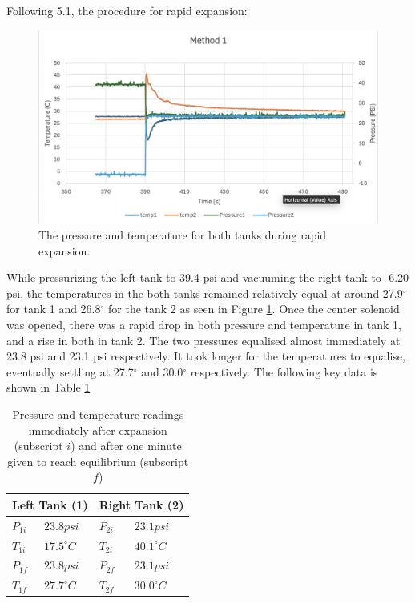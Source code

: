 \documentclass[titlepage, twocolumn, 12pt]{article}
\begin{document}
Following 5.1, the procedure for rapid expansion:

\begin{figure}[h]
    \centering
    \includegraphics[scale=0.35]{images/Method_1.png}
    \caption{The pressure and temperature for both tanks during rapid expansion.}
    \label{fig:method1}
\end{figure}

While pressurizing the left tank to 39.4 psi and vacuuming the right tank to -6.20 psi, the temperatures in the both tanks remained relatively equal at around 27.9\(^{\circ}\) for tank 1 and 26.8\(^{\circ}\) for the tank 2 as seen in Figure \ref{fig:method1}. Once the center solenoid was opened, there was a rapid drop in both pressure and temperature in tank 1, and a rise in both in tank 2. The two pressures equalised almost immediately at 23.8 psi and 23.1 psi respectively. It took longer for the temperatures to equalise, eventually settling at 27.7\(^{\circ}\) and 30.0\(^{\circ}\) respectively. The following key data is shown in Table \ref{table1}

\setlength{\tabcolsep}{0.5em} %
\begin{table}[]
\centering
\begin{tabular}{|ll|ll|}
\hline
\multicolumn{2}{|l|}{Left Tank (1)}     & \multicolumn{2}{l|}{Right Tank (2)}    \\ \hline
\multicolumn{1}{|l|}{$P_{1i}$} & $23.8psi$ & \multicolumn{1}{l|}{$P_{2i}$} & $23.1psi$ \\ \hline
\multicolumn{1}{|l|}{$T_{1i}$} & $17.5^{\circ}C$    & \multicolumn{1}{l|}{$T_{2i}$} & $40.1^{\circ}C$    \\ \hline
\multicolumn{1}{|l|}{$P_{1f}$} & $23.8psi$ & \multicolumn{1}{l|}{$P_{2f}$} & $23.1psi$ \\ \hline
\multicolumn{1}{|l|}{$T_{1f}$} & $27.7^{\circ}C$    & \multicolumn{1}{l|}{$T_{2f}$} & $30.0^{\circ}C$      \\ \hline
\end{tabular}
\caption{Pressure and temperature readings immediately after expansion (subscript $i$) and after one minute given to reach equilibrium (subscript $f$)}
\label{table1}
\end{table}
\end{document}
